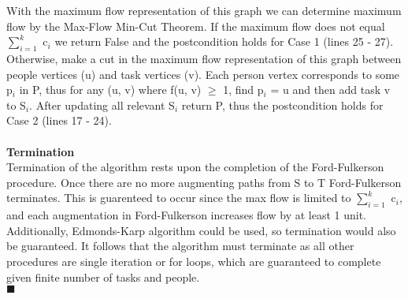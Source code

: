 \documentclass[10pt]{csc_assignment}
\begin{document}
\begin{description}
With the maximum flow representation of this graph we can determine maximum flow by the Max-Flow Min-Cut Theorem. If the maximum flow does not equal $\sum_{i = 1}^{k}$ c$_{i}$ we return False and the postcondition holds for Case 1 (lines 25 - 27). Otherwise, make a cut in the maximum flow representation of this graph between people vertices (u) and task vertices (v). Each person vertex corresponds to some p$_{i}$ in P, thus for any (u, v) where f(u, v) $\geqslant$ 1, find p$_{i}$ = u and then add task v to S$_{i}$. After updating all relevant S$_{i}$ return P, thus the postcondition holds for Case 2 (lines 17 - 24).\\
\\
\textbf{Termination}\\
Termination of the algorithm rests upon the completion of the Ford-Fulkerson procedure. Once there are no more augmenting paths from S to T  Ford-Fulkerson terminates. This is guarenteed to occur since the max flow is limited to $\sum_{i = 1}^{k}$ c$_{i}$, and each augmentation in Ford-Fulkerson increases flow by at least 1 unit. Additionally, Edmonds-Karp algorithm could be used, so termination would also be guaranteed. It follows that the algorithm must terminate as all other procedures are single iteration or for loops, which are guaranteed to complete given finite number of tasks and people.\\
$\blacksquare$\\    



\end{description}
\end{document}

